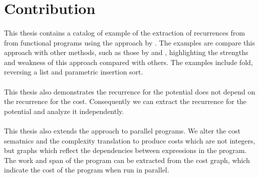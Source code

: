 \section{Contribution}

\paragraph{}
This thesis contains a catalog of example of the extraction of recurrences from from functional programs using the approach by \citet{Danner2015}. The examples are compare this approach with other methods, such as those by \citet{Avanzini2015} and \citet{HoffHof2010}, highlighting the strengths and weakness of this approach compared with others. The examples include fold, reversing a list and parametric insertion sort.

\paragraph{}
This thesis also demonstrates the recurrence for the potential does not depend on the recurrence for the cost. Consequently we can extract the recurrence for the potential and analyze it independently.

\paragraph{}
This thesis also extends the \citet{Danner2015} approach to parallel programs. We alter the cost sematnics and the complexity translation to produce costs which are not integers, but graphs which reflect the dependencies between expressions in the program. The work and span of the program can be extracted from the cost graph, which indicate the cost of the program when run in parallel.
